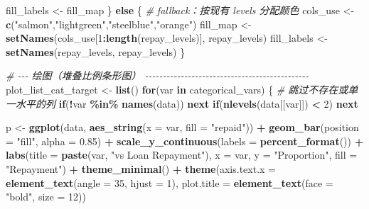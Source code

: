 \documentclass[
]{article}
\newenvironment{Shaded}{\begin{snugshade}}{\end{snugshade}}
\newcommand{\AttributeTok}[1]{\textcolor[rgb]{0.13,0.29,0.53}{#1}}
\newcommand{\CommentTok}[1]{\textcolor[rgb]{0.56,0.35,0.01}{\textit{#1}}}
\newcommand{\ControlFlowTok}[1]{\textcolor[rgb]{0.13,0.29,0.53}{\textbf{#1}}}
\newcommand{\DecValTok}[1]{\textcolor[rgb]{0.00,0.00,0.81}{#1}}
\newcommand{\FloatTok}[1]{\textcolor[rgb]{0.00,0.00,0.81}{#1}}
\newcommand{\FunctionTok}[1]{\textcolor[rgb]{0.13,0.29,0.53}{\textbf{#1}}}
\newcommand{\NormalTok}[1]{#1}
\newcommand{\OtherTok}[1]{\textcolor[rgb]{0.56,0.35,0.01}{#1}}
\newcommand{\SpecialCharTok}[1]{\textcolor[rgb]{0.81,0.36,0.00}{\textbf{#1}}}
\newcommand{\StringTok}[1]{\textcolor[rgb]{0.31,0.60,0.02}{#1}}
\begin{document}
\begin{Shaded}
\begin{Highlighting}[]
\NormalTok{  fill\_labels }\OtherTok{\textless{}{-}}\NormalTok{ fill\_map}
\NormalTok{\} }\ControlFlowTok{else}\NormalTok{ \{}
  \CommentTok{\# fallback：按现有 levels 分配颜色}
\NormalTok{  cols\_use }\OtherTok{\textless{}{-}} \FunctionTok{c}\NormalTok{(}\StringTok{"salmon"}\NormalTok{,}\StringTok{"lightgreen"}\NormalTok{,}\StringTok{"steelblue"}\NormalTok{,}\StringTok{"orange"}\NormalTok{)}
\NormalTok{  fill\_map }\OtherTok{\textless{}{-}} \FunctionTok{setNames}\NormalTok{(cols\_use[}\DecValTok{1}\SpecialCharTok{:}\FunctionTok{length}\NormalTok{(repay\_levels)], repay\_levels)}
\NormalTok{  fill\_labels }\OtherTok{\textless{}{-}} \FunctionTok{setNames}\NormalTok{(repay\_levels, repay\_levels)}
\NormalTok{\}}

\CommentTok{\# {-}{-}{-} 绘图（堆叠比例条形图） {-}{-}{-}{-}{-}{-}{-}{-}{-}{-}{-}{-}{-}{-}{-}{-}{-}{-}{-}{-}{-}{-}{-}{-}{-}{-}{-}{-}{-}{-}{-}{-}{-}{-}{-}{-}{-}{-}{-}{-}{-}{-}{-}{-}{-}{-}}
\NormalTok{plot\_list\_cat\_target }\OtherTok{\textless{}{-}} \FunctionTok{list}\NormalTok{()}
\ControlFlowTok{for}\NormalTok{(var }\ControlFlowTok{in}\NormalTok{ categorical\_vars) \{}
  \CommentTok{\# 跳过不存在或单一水平的列}
  \ControlFlowTok{if}\NormalTok{(}\SpecialCharTok{!}\NormalTok{var }\SpecialCharTok{\%in\%} \FunctionTok{names}\NormalTok{(data)) }\ControlFlowTok{next}
  \ControlFlowTok{if}\NormalTok{(}\FunctionTok{nlevels}\NormalTok{(data[[var]]) }\SpecialCharTok{\textless{}} \DecValTok{2}\NormalTok{) }\ControlFlowTok{next}
  
\NormalTok{  p }\OtherTok{\textless{}{-}} \FunctionTok{ggplot}\NormalTok{(data, }\FunctionTok{aes\_string}\NormalTok{(}\AttributeTok{x =}\NormalTok{ var, }\AttributeTok{fill =} \StringTok{"repaid"}\NormalTok{)) }\SpecialCharTok{+}
    \FunctionTok{geom\_bar}\NormalTok{(}\AttributeTok{position =} \StringTok{"fill"}\NormalTok{, }\AttributeTok{alpha =} \FloatTok{0.85}\NormalTok{) }\SpecialCharTok{+}
    \FunctionTok{scale\_y\_continuous}\NormalTok{(}\AttributeTok{labels =} \FunctionTok{percent\_format}\NormalTok{()) }\SpecialCharTok{+}
    \FunctionTok{labs}\NormalTok{(}\AttributeTok{title =} \FunctionTok{paste}\NormalTok{(var, }\StringTok{"vs Loan Repayment"}\NormalTok{),}
         \AttributeTok{x =}\NormalTok{ var, }\AttributeTok{y =} \StringTok{"Proportion"}\NormalTok{, }\AttributeTok{fill =} \StringTok{"Repayment"}\NormalTok{) }\SpecialCharTok{+}
    \FunctionTok{theme\_minimal}\NormalTok{() }\SpecialCharTok{+}
    \FunctionTok{theme}\NormalTok{(}\AttributeTok{axis.text.x =} \FunctionTok{element\_text}\NormalTok{(}\AttributeTok{angle =} \DecValTok{35}\NormalTok{, }\AttributeTok{hjust =} \DecValTok{1}\NormalTok{),}
          \AttributeTok{plot.title =} \FunctionTok{element\_text}\NormalTok{(}\AttributeTok{face =} \StringTok{"bold"}\NormalTok{, }\AttributeTok{size =} \DecValTok{12}\NormalTok{))}
  

\end{Highlighting}
\end{Shaded}
\end{document}
